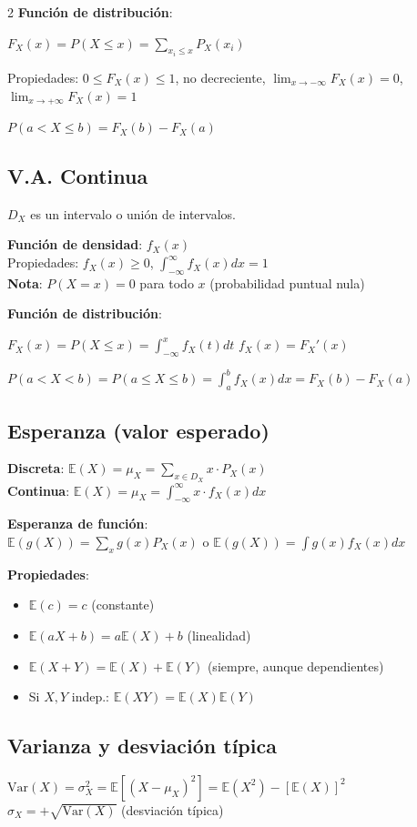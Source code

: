 \documentclass[9pt,a4paper]{article}
\newcommand{\E}{\mathbb{E}}
\newcommand{\Var}{\text{Var}}
\begin{document}
\begin{multicols}{2}
\textbf{Función de distribución}: 
\begin{formulabox}
$F_X(x)=P(X\leq x)=\sum_{x_i\leq x}P_X(x_i)$
\end{formulabox}
Propiedades: $0\leq F_X(x)\leq 1$, no decreciente, $\lim_{x\to-\infty}F_X(x)=0$, $\lim_{x\to+\infty}F_X(x)=1$

$P(a<X\leq b)=F_X(b)-F_X(a)$

\subsection{V.A. Continua}
$D_X$ es un intervalo o unión de intervalos.

\textbf{Función de densidad}: $f_X(x)$\\
Propiedades: $f_X(x)\geq 0$, \quad $\int_{-\infty}^{\infty}f_X(x)dx=1$\\
\textbf{Nota}: $P(X=x)=0$ para todo $x$ (probabilidad puntual nula)

\textbf{Función de distribución}:
\begin{formulabox}
$F_X(x)=P(X\leq x)=\int_{-\infty}^{x}f_X(t)dt$ \quad $f_X(x)=F_X'(x)$
\end{formulabox}

$P(a<X<b)=P(a\leq X\leq b)=\int_a^b f_X(x)dx=F_X(b)-F_X(a)$

\subsection{Esperanza (valor esperado)}
\begin{formulabox}
\textbf{Discreta}: $\E(X)=\mu_X=\sum_{x\in D_X} x\cdot P_X(x)$\\[3pt]
\textbf{Continua}: $\E(X)=\mu_X=\int_{-\infty}^{\infty}x\cdot f_X(x)dx$
\end{formulabox}

\textbf{Esperanza de función}:\\
$\E(g(X))=\sum_x g(x)P_X(x)$ \quad o \quad $\E(g(X))=\int g(x)f_X(x)dx$

\textbf{Propiedades}:
\begin{itemize}[leftmargin=*]
\item $\E(c)=c$ (constante)
\item $\E(aX+b)=a\E(X)+b$ (linealidad)
\item $\E(X+Y)=\E(X)+\E(Y)$ (siempre, aunque dependientes)
\item Si $X,Y$ indep.: $\E(XY)=\E(X)\E(Y)$
\end{itemize}

\subsection{Varianza y desviación típica}
\begin{formulabox}
$\Var(X)=\sigma_X^2=\E[(X-\mu_X)^2]=\E(X^2)-[\E(X)]^2$\\[3pt]
$\sigma_X=+\sqrt{\Var(X)}$ \quad (desviación típica)
\end{formulabox}


\end{multicols}
\end{document}
